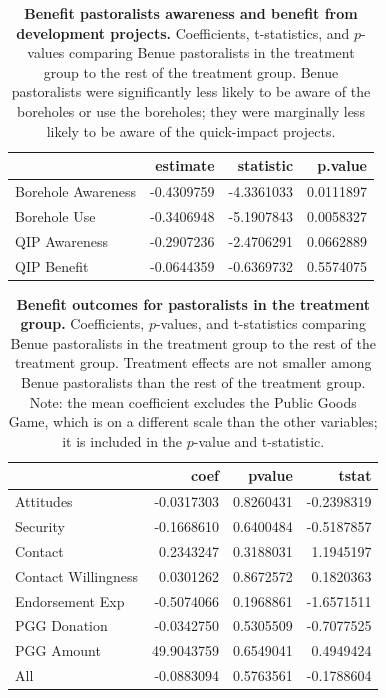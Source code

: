 \documentclass[
]{article}
\begin{document}
\begin{table}[H]
\begin{center}
\label{tab:BenPast_Benefit_tab}
\caption{\textbf{Benefit pastoralists awareness and benefit from development projects.} Coefficients, t-statistics, and $p$-values comparing Benue pastoralists in the treatment group to the rest of the treatment group. Benue pastoralists were significantly less likely to be aware of the boreholes or use the boreholes; they were marginally less likely to be aware of the quick-impact projects.}
\smallskip

\begin{tabular}{l|r|r|r}
\hline
  & estimate & statistic & p.value\\
\hline
Borehole Awareness & -0.4309759 & -4.3361033 & 0.0111897\\
\hline
Borehole Use & -0.3406948 & -5.1907843 & 0.0058327\\
\hline
QIP Awareness & -0.2907236 & -2.4706291 & 0.0662889\\
\hline
QIP Benefit & -0.0644359 & -0.6369732 & 0.5574075\\
\hline
\end{tabular}


\end{center}
\end{table}

\begin{table}[H]
\begin{center}
\label{tab:benPast_tab}
\caption{\textbf{Benefit outcomes for pastoralists in the treatment group.} Coefficients, $p$-values, and t-statistics comparing Benue pastoralists in the treatment group to the rest of the treatment group. Treatment effects are not smaller among Benue pastoralists than the rest of the treatment group. Note: the mean coefficient excludes the Public Goods Game, which is on a different scale than the other variables; it is included in the $p$-value and t-statistic.}
\smallskip

\begin{tabular}{l|r|r|r}
\hline
  & coef & pvalue & tstat\\
\hline
Attitudes & -0.0317303 & 0.8260431 & -0.2398319\\
\hline
Security & -0.1668610 & 0.6400484 & -0.5187857\\
\hline
Contact & 0.2343247 & 0.3188031 & 1.1945197\\
\hline
Contact Willingness & 0.0301262 & 0.8672572 & 0.1820363\\
\hline
Endorsement Exp & -0.5074066 & 0.1968861 & -1.6571511\\
\hline
PGG Donation & -0.0342750 & 0.5305509 & -0.7077525\\
\hline
PGG Amount & 49.9043759 & 0.6549041 & 0.4949424\\
\hline
All & -0.0883094 & 0.5763561 & -0.1788604\\
\hline
\end{tabular}


\end{center}
\end{table}
\end{document}
